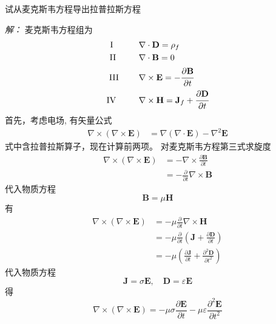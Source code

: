 \begin{example}
试从麦克斯韦方程导出拉普拉斯方程 
\end{example}
\emph{解：}
 麦克斯韦方程组为
			\[ \begin{aligned}
					\text{I}~~~ \hspace*{2em}&\nabla \cdot \mathbf{D} =\rho _f  \\  
					\text{II}~~ \hspace*{2em}&\nabla \cdot \mathbf{B} = 0  \\  
					\text{III}~ \hspace*{2em}&\nabla \times  \mathbf{E} = -\cfrac{\partial \mathbf{B}}{\partial t }  \\  
					\text{IV~}~ \hspace*{2em}&\nabla \times  \mathbf{H} = \mathbf{J}_f +  \cfrac{\partial \mathbf{D}}{\partial t } 
				\end{aligned} \]
首先，考虑电场, 有矢量公式
\begin{equation}\label{eq:vect}
  \begin{aligned}
	  \nabla \times (\nabla \times  \mathbf{E}) &=  \nabla (\nabla \cdot  \mathbf{E})- \nabla^2 \mathbf{E} 
  \end{aligned}
\end{equation}
式中含拉普拉斯算子，现在计算前两项。
对麦克斯韦方程第三式求旋度
  $$
  \begin{aligned}
  \nabla \times(\nabla \times \mathbf{E}) & =-\nabla \times \frac{\partial \mathbf{B}}{\partial t} \\
  &=-\frac{\partial}{\partial t} \nabla \times \mathbf{B} 
  \end{aligned}
  $$
  代入物质方程
$$
\mathbf{B}=\mu \mathbf{H}
$$
有
$$
\begin{aligned}
\nabla \times(\nabla \times \mathbf{E}) 
& =-\mu \frac{\partial}{\partial t} \nabla \times \mathbf{H}\\
&=-\mu \frac{\partial}{\partial t}\left(\mathbf{J}+\frac{\partial \mathbf{D}}{\partial t}\right) \\
& =-\mu\left(\frac{\partial \mathbf{J}}{\partial t}+\frac{\partial^2 \mathbf{D}}{\partial t^2}\right)
\end{aligned}
  $$
  代入物质方程
$$
\mathbf{J}=\sigma \mathbf{E}, \quad \mathbf{D}=\varepsilon \mathbf{E}  
$$
得
\begin{equation}\label{eq:vect1}
\nabla \times(\nabla \times \mathbf{E})=-\mu \sigma \frac{\partial \mathbf{E}}{\partial t}-\mu \varepsilon \frac{\partial^2 \mathbf{E}}{\partial t^2} 
\end{equation}
